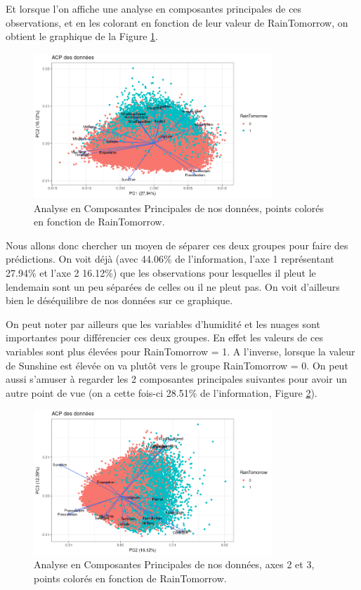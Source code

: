\documentclass{article}
\begin{document}
Et lorsque l'on affiche une analyse en composantes principales de ces observations, et en les colorant en fonction de leur valeur de RainTomorrow, on obtient le graphique de la Figure \ref{fig:pca_raintomorrow}.

\begin{figure}[htp]
    \centering
    \includegraphics[width=0.8\textwidth]{Images/pca/pca.png}
    \caption{Analyse en Composantes Principales de nos données, points colorés en fonction de RainTomorrow.}
    \label{fig:pca_raintomorrow}
\end{figure}

Nous allons donc chercher un moyen de séparer ces deux groupes pour faire des prédictions. On voit déjà (avec 44.06\% de l'information, l'axe 1 représentant 27.94\% et l'axe 2 16.12\%) que les observations pour lesquelles il pleut le lendemain sont un peu séparées de celles ou il ne pleut pas. On voit d'ailleurs bien le déséquilibre de nos données sur ce graphique.

On peut noter par ailleurs que les variables d'humidité et les nuages sont importantes pour différencier ces deux groupes. En effet les valeurs de ces variables sont plus élevées pour RainTomorrow = 1. A l'inverse, lorsque la valeur de Sunshine est élevée on va plutôt vers le groupe RainTomorrow = 0. On peut aussi s'amuser à regarder les 2 composantes principales suivantes pour avoir un autre point de vue (on a cette fois-ci 28.51\% de l'information, Figure \ref{fig:pca_raintomorrow2}).

\begin{figure}[htp]
    \centering
    \includegraphics[width=0.8\textwidth]{Images/pca/pca2.png}
    \caption{Analyse en Composantes Principales de nos données, axes 2 et 3, points colorés en fonction de RainTomorrow.}
    \label{fig:pca_raintomorrow2}
\end{figure}
\end{document}
